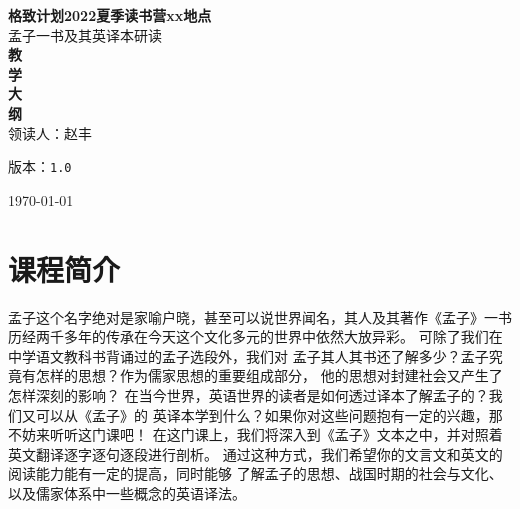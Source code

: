 \documentclass[12pt]{ctexart}
\def\version{1.0}
\newenvironment{smaller}{\zihao{5}}{\zihao{-4}}
\begin{document}
\begin{titlepage}
\begin{center}
    \vspace{-0.5in}
    \textmd{\textbf{\huge{格致计划2022夏季读书营xx地点}}}\\
    \normalsize\vspace{0.1in}\Large{孟子一书及其英译本研读}\\
    \vspace{0.8in}
     \textbf{\huge{教}}\\
    \vspace{0.8in}
     \textbf{\huge{学}}\\
    \vspace{0.8in}
     \textbf{\huge{大}}\\
    \vspace{0.8in}
    \textbf{\huge{纲}}\\
    \vspace{0.8in}
    领读人：赵丰
\vspace{0.2in}
\begin{smaller}

版本：\texttt{\version}

\today
\end{smaller}
\end{center}
\end{titlepage}
\thispagestyle{empty}
\pagebreak
\pagestyle{runningpage}

\section{课程简介}
孟子这个名字绝对是家喻户晓，甚至可以说世界闻名，其人及其著作《孟子》一书
历经两千多年的传承在今天这个文化多元的世界中依然大放异彩。
可除了我们在中学语文教科书背诵过的孟子选段外，我们对
孟子其人其书还了解多少？孟子究竟有怎样的思想？作为儒家思想的重要组成部分，
他的思想对封建社会又产生了怎样深刻的影响？
在当今世界，英语世界的读者是如何透过译本了解孟子的？我们又可以从《孟子》的
英译本学到什么？如果你对这些问题抱有一定的兴趣，那不妨来听听这门课吧！
在这门课上，我们将深入到《孟子》文本之中，并对照着英文翻译逐字逐句逐段进行剖析。
通过这种方式，我们希望你的文言文和英文的阅读能力能有一定的提高，同时能够
了解孟子的思想、战国时期的社会与文化、
以及儒家体系中一些概念的英语译法。
\end{document}
